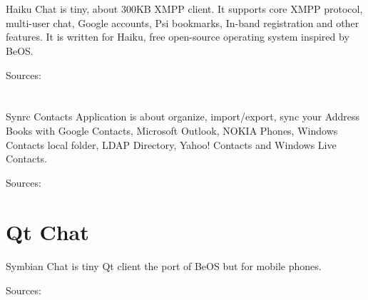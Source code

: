 \documentclass[11pt]{article}
\begin{document}
\section*{}
\paragraph{}
Haiku Chat is tiny, about 300KB XMPP client.
It supports core XMPP protocol, multi-user chat, Google accounts,
Psi bookmarks, In-band registration and other features.
It is written for Haiku, free open-source operating system inspired by BeOS.

Sources: 


\section*{}
\paragraph{}
Synrc Contacts Application is about organize,
import/export, sync your Address Books with Google Contacts,
Microsoft Outlook, NOKIA Phones, Windows Contacts local folder,
LDAP Directory, Yahoo! Contacts and Windows Live Contacts.

Sources: 

\section*{Qt Chat}
\paragraph{}
Symbian Chat is tiny Qt client the port of BeOS but for mobile phones.

Sources: 
\end{document}
